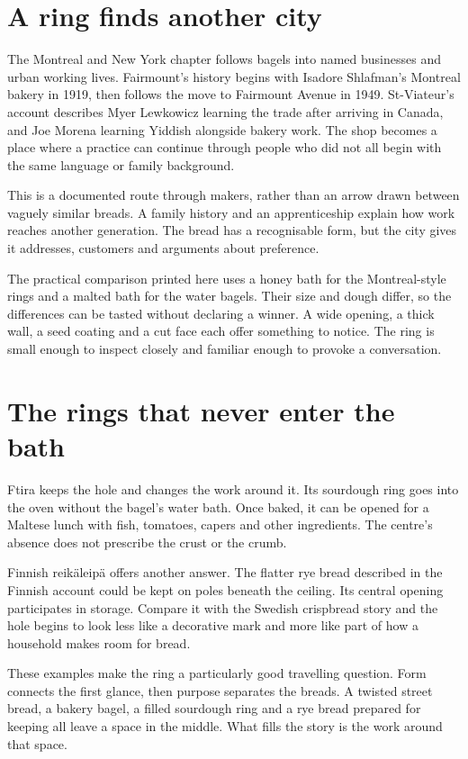 \section{A ring finds another city}
The Montreal and New York chapter follows bagels into named businesses and urban working lives. Fairmount's history begins with Isadore Shlafman's Montreal bakery in 1919, then follows the move to Fairmount Avenue in 1949. St-Viateur's account describes Myer Lewkowicz learning the trade after arriving in Canada, and Joe Morena learning Yiddish alongside bakery work. The shop becomes a place where a practice can continue through people who did not all begin with the same language or family background.\citep{fairmount08,stviateur08}

This is a documented route through makers, rather than an arrow drawn between vaguely similar breads. A family history and an apprenticeship explain how work reaches another generation. The bread has a recognisable form, but the city gives it addresses, customers and arguments about preference.

The practical comparison printed here uses a honey bath for the Montreal-style rings and a malted bath for the water bagels. Their size and dough differ, so the differences can be tasted without declaring a winner. A wide opening, a thick wall, a seed coating and a cut face each offer something to notice. The ring is small enough to inspect closely and familiar enough to provoke a conversation.

\section{The rings that never enter the bath}
Ftira keeps the hole and changes the work around it. Its sourdough ring goes into the oven without the bagel's water bath. Once baked, it can be opened for a Maltese lunch with fish, tomatoes, capers and other ingredients. The centre's absence does not prescribe the crust or the crumb.\citep{ftira,ftirafilling}

Finnish reikäleipä offers another answer. The flatter rye bread described in the Finnish account could be kept on poles beneath the ceiling. Its central opening participates in storage. Compare it with the Swedish crispbread story and the hole begins to look less like a decorative mark and more like part of how a household makes room for bread.\citep{finroot,duxknack}

These examples make the ring a particularly good travelling question. Form connects the first glance, then purpose separates the breads. A twisted street bread, a bakery bagel, a filled sourdough ring and a rye bread prepared for keeping all leave a space in the middle. What fills the story is the work around that space.

